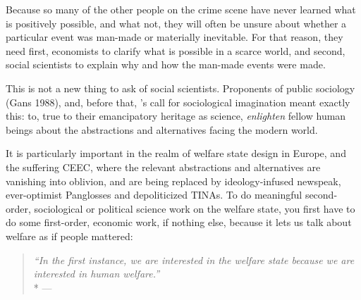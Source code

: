 Because so many of the other people on the crime scene have never learned what is positively possible, and what not, they will often be unsure about whether a particular event was man-made or materially inevitable.
For that reason, they need first, economists to clarify what is possible in a scarce world, and second, social scientists to explain why and how the man-made events were made.

This is not a new thing to ask of social scientists.
Proponents of public sociology (Gans 1988), and, before that, \citeauthor{Mills-1959-aa}'s call for sociological imagination meant exactly this:
to, true to their emancipatory heritage as science, \emph{enlighten} fellow human beings about the abstractions and alternatives facing the modern world.

It is particularly important in the realm of welfare state design in Europe, and the suffering \gls{CEEC}, where the relevant abstractions and alternatives are vanishing into oblivion, and are being replaced by ideology-infused newspeak, ever-optimist Panglosses and depoliticized TINAs.
To do meaningful second-order, sociological or political science work on the welfare state, you first have to do some first-order, economic work, if nothing else, because it lets us talk about welfare as if people mattered:

\begin{quote}
	\emph{``In the first instance, we are interested in the welfare state because we are interested in human welfare.''}
	\\*
	--- \citet*[236]{Haggard2009}
\end{quote}

